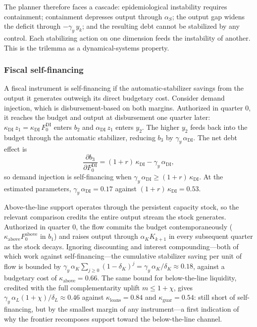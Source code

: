 \documentclass[12pt, a4paper]{article}
\begin{document}
The planner therefore faces a cascade: epidemiological instability requires
containment; containment depresses output through $\alpha_S$; the output gap widens
the deficit through $-\gamma_y\, y_k$; and the resulting debt cannot be stabilized
by any control. Each stabilizing action on one dimension feeds the instability of
another. This is the trilemma as a dynamical-systems property.

\subsubsection*{Fiscal self-financing}

A fiscal instrument is self-financing if the automatic-stabilizer savings from the
output it generates outweigh its direct budgetary cost. Consider demand injection,
which is disbursement-based on both margins. Authorized in quarter $0$, it reaches
the budget and output at disbursement one quarter later:
$\kappa_{\text{DI}}\, z_1 = \kappa_{\text{DI}}\, F^{\text{DI}}_0$ enters $b_2$ and
$\alpha_{\text{DI}}\, z_1$ enters $y_2$. The higher $y_2$ feeds back into the
budget through the automatic stabilizer, reducing $b_3$ by
$\gamma_y\,\alpha_{\text{DI}}$. The net debt effect is
%
\begin{equation}
    \frac{\partial b_3}{\partial F^{\text{DI}}_0}
    = (1+r)\,\kappa_{\text{DI}} - \gamma_y\,\alpha_{\text{DI}},
    \label{eq:DI_selffinance}
\end{equation}
%
so demand injection is self-financing when
$\gamma_y\,\alpha_{\text{DI}} \ge (1+r)\,\kappa_{\text{DI}}$. At the estimated
parameters, $\gamma_y\,\alpha_{\text{DI}} = 0.17$ against
$(1+r)\,\kappa_{\text{DI}} = 0.53$.

Above-the-line support operates through the persistent capacity stock, so the
relevant comparison credits the entire output stream the stock generates.
Authorized in quarter $0$, the flow commits the budget contemporaneously
($\kappa_{\text{above}} F^{\text{above}}_0$ in $b_1$) and raises output through
$\alpha_K K_{k+1}$ in every subsequent quarter as the stock decays. Ignoring
discounting and interest compounding---both of which work against
self-financing---the cumulative stabilizer saving per unit of flow is bounded by
$\gamma_y\,\alpha_K \sum_{j\ge 0}(1-\delta_K)^j = \gamma_y\,\alpha_K/\delta_K
\approx 0.18$, against a budgetary cost of $\kappa_{\text{above}} = 0.66$. The
same bound for below-the-line liquidity, credited with the full complementarity
uplift $m \le 1+\chi$, gives
$\gamma_y\,\alpha_L(1+\chi)/\delta_L \approx 0.46$ against
$\kappa_{\text{loans}} = 0.84$ and $\kappa_{\text{guar}} = 0.54$: still short of
self-financing, but by the smallest margin of any instrument---a first indication
of why the frontier recomposes support toward the below-the-line channel.
\end{document}
